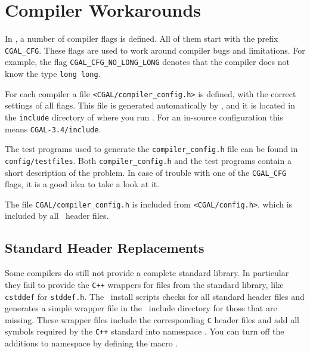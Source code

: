 

\section{Compiler Workarounds}

In \cgal, a number of compiler flags is defined. All of them start
with the prefix \texttt{CGAL\_CFG}. These flags are used to work
around compiler bugs and limitations. For example, the flag
\texttt{CGAL\_CFG\_NO\_LONG\_LONG} denotes that the compiler does not
know the type \texttt{long long}.

For each compiler a file \texttt{<CGAL/compiler\_config.h>}
 is defined, with the correct
settings of all flags. This file is generated automatically by 
\cmake, and it is located in the \texttt{include} directory of
where you run \cmake. For an in-source configuration this means
\texttt{CGAL-3.4/include}.

The test programs used to generate the \texttt{compiler\_config.h}
file can be found in \texttt{config/testfiles}.
 Both
\texttt{compiler\_config.h} and the test programs contain a short
description of the problem. In case of trouble with one of the
\texttt{CGAL\_CFG} flags, it is a good idea to take a look at it.

The file \texttt{CGAL/compiler\_config.h} is included from
\texttt{<CGAL/config.h>}.
which is included by all \cgal\ header files.

\subsection{Standard Header Replacements}

Some compilers do still not provide a complete standard library. In
particular they fail to provide the \texttt{C++} wrappers for files
from the standard  library, like \texttt{cstddef} for
\texttt{stddef.h}. The \cgal\ install scripts checks for all standard
header files and generates a simple wrapper file in the \cgal\ include
directory for those that are missing. These wrapper files include the
corresponding \texttt{C} header files and add all symbols required by
the \texttt{C++} standard into namespace . You can turn off
the additions to namespace  by defining the macro
.

